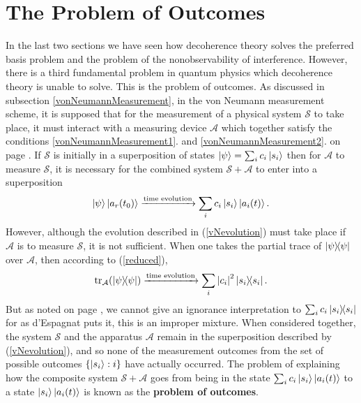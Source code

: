     \section{The Problem of Outcomes}\label{probOutcomes}
    In the last two sections we have seen how decoherence theory solves the preferred basis problem and the problem of the nonobservability of interference. However, there is a third fundamental problem in quantum physics which decoherence theory is unable to solve. This is the problem of outcomes. As discussed in subsection \ref{vonNeumannMeasurement}, in the von Neumann measurement scheme, it is supposed that for the measurement of a physical system $\mathcal{S}$ to take place, it must interact with a measuring device $\mathcal{A}$ which together satisfy the conditions \ref{vonNeumannMeasurement1}. and \ref{vonNeumannMeasurement2}. on page \pageref{vonNeumannMeasurement1}. If $\mathcal{S}$ is initially in a superposition of states $\ket{\psi}=\sum_i c_i\ket{s_i}$ then for $\mathcal{A}$ to measure $\mathcal{S}$, it is necessary for the combined system $\mathcal{S}+\mathcal{A}$ to enter into a superposition
    \begin{equation}\label{vNevolution}
    \ket{\psi}\ket{a_r(t_0)}\xrightarrow{\text{time evolution}}\sum_i c_i\ket{s_i}\ket{a_i(t)}.
    \end{equation}
    However, although the evolution described in (\ref{vNevolution}) must take place if $\mathcal{A}$ is to measure $\mathcal{S}$, it is not sufficient. When one takes the partial trace of $\dyad{\psi}$ over $\mathcal{A}$, then according to (\ref{reduced}),
    \begin{equation}\label{vNevolution2}
    \tr_\mathcal{A}(\dyad{\psi})\xrightarrow{\text{time evolution}}\sum_i \abs{c_i}^2\dyad{s_i}.
    \end{equation}
    But as noted on page \pageref{Espagnat}, we cannot give an ignorance interpretation to $\sum_i c_i\dyad{s_i}$ for as d'Espagnat puts it, this is an improper mixture. When considered together, the system $\mathcal{S}$ and the apparatus $\mathcal{A}$ remain in the superposition described by (\ref{vNevolution}), and so none of the measurement outcomes from the set of possible outcomes $\{\ket{s_i}:i\}$ have actually occurred. The problem of explaining how the composite system   $\mathcal{S}+\mathcal{A}$       goes from being in the state $\sum_i c_i\ket{s_i}\ket{a_i(t)}$ to a state $\ket{s_i}\ket{a_i(t)}$ is known as the \textbf{problem of outcomes}. 
    
   